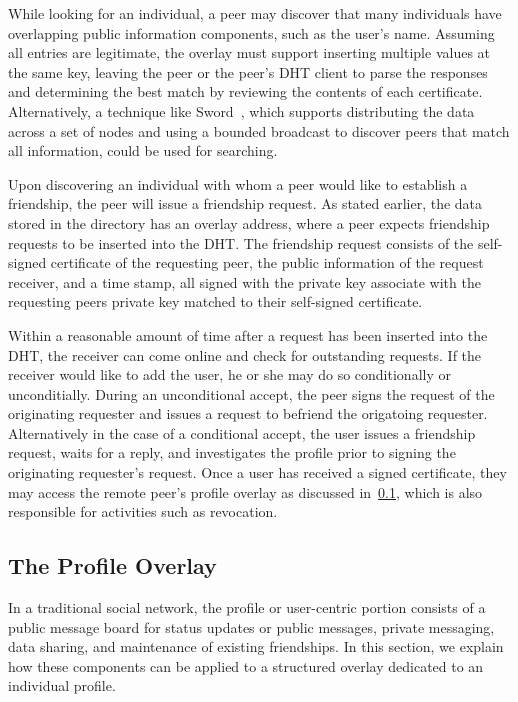 \documentclass[letterpaper,twocolumn,10pt]{article}
\begin{document}
While looking for an individual, a peer may discover that many individuals have
overlapping public information components, such as the user's name.  Assuming
all entries are legitimate, the overlay must support inserting multiple values
at the same key, leaving the peer or the peer's DHT client to parse the
responses and determining the best match by reviewing the contents of each
certificate.  Alternatively, a technique like Sword~\cite{sword}, which supports
distributing the data across a set of nodes and using a bounded broadcast to
discover peers that match all information, could be used for searching.

Upon discovering an individual with whom a peer would like to establish a
friendship, the peer will issue a friendship request.  As stated earlier, the
data stored in the directory has an overlay address, where a peer expects
friendship requests to be inserted into the DHT.  The friendship request
consists of the self-signed certificate of the requesting peer, the public
information of the request receiver, and a time stamp, all signed with the
private key associate with the requesting peers private key matched to their
self-signed certificate.

Within a reasonable amount of time after a request has been inserted into the
DHT, the receiver can come online and check for outstanding requests.  If the
receiver would like to add the user, he or she may do so conditionally or
unconditially.  During an unconditional accept, the peer signs the request of the
originating requester and issues a request to befriend the origatoing requester.
Alternatively in the case of a conditional accept, the user issues a friendship
request, waits for a reply, and investigates the profile prior to signing the
originating requester's request.  Once a user has received a signed certificate,
they may access the remote peer's profile overlay as discussed
in~\ref{profile_overlay}, which is also responsible for activities such as
revocation.


\subsection{The Profile Overlay}
\label{profile_overlay}
In a traditional social network, the profile or user-centric portion consists
of a public message board for status updates or public messages, private
messaging, data sharing, and maintenance of existing friendships.  In this
section, we explain how these components can be applied to a structured overlay
dedicated to an individual profile.
\end{document}
